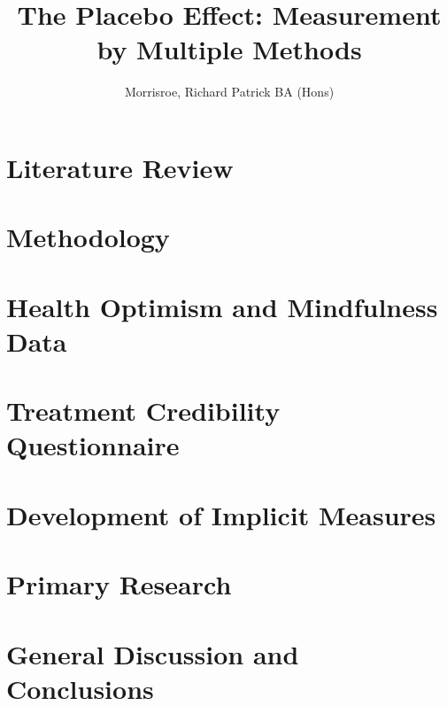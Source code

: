 \documentclass[apsych, phd]{uccthesis}
\title{The Placebo Effect: Measurement by Multiple Methods}
\author{Morrisroe, Richard Patrick BA (Hons)}
\begin{document}


\tableofcontents

\label{cha:intr-rese}


\chapter{Literature Review}
\label{cha:literature-review}


\chapter{Methodology}
\label{cha:methodology}




\chapter{Health Optimism and Mindfulness Data}
\label{cha:health-for-thesis}


\chapter{Treatment Credibility Questionnaire}
\label{cha:tcq-thesis}


\chapter{Development of Implicit Measures}
\label{cha:devel-impl-meas}
% 

\chapter{Primary Research}
\label{cha:primary-research}


\chapter{General Discussion and Conclusions}
\label{cha:general-discussion}




\end{document}

